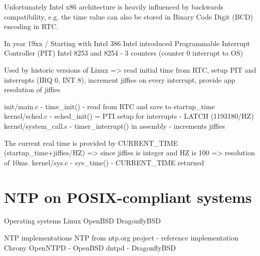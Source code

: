 Unfortunately Intel x86 architecture is heavily influenced by backwards compatibility,
e.g. the time value can also be stored in Binary Code Digit (BCD) encoding in RTC.

In year 19xx / Starting with Intel 386
Intel introduced
Programmable Interrupt Controller (PIT) Intel 8253 and 8254 - 3 counters (counter 0 interrupt to OS)


Used by historic versions of Linux
=> read initial time from RTC, setup PIT and interrupts (IRQ 0, INT 8), increment jiffies on every interrupt, provide app resolution of jiffies

init/main.c - time\_init() - read from RTC and save to startup\_time
kernel/sched.c - sched\_init() = PTI setup for interrupts - LATCH (1193180/HZ)
kernel/system\_call.s - timer\_interrupt() in assembly - increments jiffies

The current real time is provided by CURRENT\_TIME (startup\_time+jiffies/HZ) => since jiffies is integer and HZ is 100 => resolution of 10ms.
kernel/sys.c - sys\_time() - CURRENT\_TIME returned


\section{NTP on POSIX-compliant systems}
Operating systems
Linux
OpenBSD
DragonflyBSD

NTP implementations
NTP from ntp.org project - reference implementation
Chrony
OpenNTPD - OpenBSD
dntpd - DragonflyBSD

